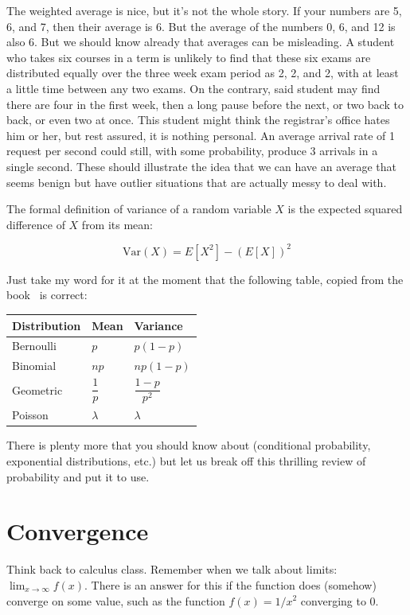The weighted average is nice, but it's not the whole story. If your numbers are 5, 6, and 7, then their average is 6. But the average of the numbers 0, 6, and 12 is also 6. But we should know already that averages can be misleading. A student who takes six courses in a term is unlikely to find that these six exams are distributed equally over the three week exam period as 2, 2, and 2, with at least a little time between any two exams. On the contrary, said student may find there are four in the first week, then a long pause before the next, or two back to back, or even two at once. This student might think the registrar's office hates him or her, but rest assured, it is nothing personal. An average arrival rate of 1 request per second could still, with some probability, produce 3 arrivals in a single second. These should illustrate the idea that we can have an average that seems benign but have outlier situations that are actually messy to deal with.

The formal definition of variance of a random variable $X$ is the expected squared difference of $X$ from its mean:

\[
	\mathrm{Var}(X) = E[X^{2}] - (E[X])^{2}
\]

Just take my word for it at the moment that the following table, copied from the book~\cite{pmd} is correct:

\begin{center}
\begin{tabular}{l|l|l}
	\textbf{Distribution} & \textbf{Mean} & \textbf{Variance}\\ \hline
	Bernoulli & $p$ & $p(1-p)$\\ \hline
	Binomial & $np$ & $np(1-p)$\\ \hline
	Geometric & $\dfrac{1}{p}$ & $\dfrac{1-p}{p^{2}}$ \\ \hline
	Poisson & $\lambda$ & $\lambda$
\end{tabular}
\end{center}

There is plenty more that you should know about (conditional probability, exponential distributions, etc.) but let us break off this thrilling review of probability and put it to use.

\section*{Convergence}

Think back to calculus class. Remember when we talk about limits: $\lim_{x\to\infty} f(x)$. There is an answer for this if the function does (somehow) converge on some value, such as the function $f(x) = 1/x^{2}$ converging to 0.

